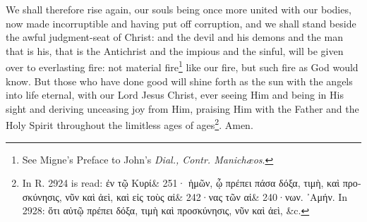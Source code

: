 We shall therefore rise again, our souls being once more united with our bodies, now made incorruptible and having put off corruption, and we shall stand beside the awful judgment-seat of Christ: and the devil and his demons and the man that is his, that is the Antichrist and the impious and the sinful, will be given over to everlasting fire: not material fire\footnote{See Migne’s Preface to John’s \emph{Dial., Contr. Manichæos}.} like our fire, but such fire as God would know. But those who have done good will shine forth as the sun with the angels into life eternal, with our Lord Jesus Christ, ever seeing Him and being in His sight and deriving unceasing joy from Him, praising Him with the Father and the Holy Spirit throughout the limitless ages of ages\footnote{In R. 2924 is read: \textgreek{ἐν τῷ Κυρί\& 251· ἡμῶν, ᾧ πρέπει πάσα δόξα, τιμὴ, καὶ προσκύνησις, νῦν καὶ ἀεὶ, καὶ εἰς τοὺς αἰ\& 242·νας τῶν αἰ\& 240·νων. ᾽Αμήν.} In 2928: \textgreek{ὅτι αὐτῷ πρέπει δόξα, τιμὴ καὶ προσκύνησις, νῦν καὶ ἀεὶ}, \&c.}. Amen.

